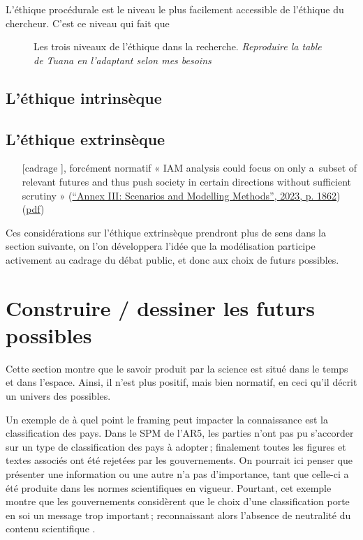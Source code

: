 L'éthique procédurale est le niveau le plus facilement accessible de l'éthique du chercheur. C'est ce niveau qui fait que 

\begin{figure}
    \centering
    \caption{Les trois niveaux de l'éthique dans la recherche. \textit{Reproduire la table de Tuana en l'adaptant selon mes besoins}}
    \label{fig:diag-venn}
\end{figure}

\subsection{L'éthique intrinsèque}

\subsection{L'éthique extrinsèque}


\begin{itemize}
    \item [[cadrage]], forcément normatif
« IAM analysis could focus on only a subset of relevant futures and thus push society in certain directions without sufficient scrutiny » (\href{zotero://select/library/items/2SDDNUUF}{“Annex III: Scenarios and Modelling Methods”, 2023, p. 1862}) (\href{zotero://open-pdf/library/items/CHVFSLLH?page=22&annotation=4MBM5B9Q}{pdf})

\end{itemize}

 Ces considérations sur l'éthique extrinsèque prendront plus de sens dans la section suivante, on l'on développera l'idée que la modélisation participe activement au cadrage du débat public, et donc aux choix de futurs possibles. 

\section{Construire / dessiner les futurs possibles}

Cette section montre que le savoir produit par la science est situé dans le temps et dans l'espace. Ainsi, il n'est plus positif, mais bien normatif, en ceci qu'il décrit un univers des possibles. 

Un exemple de à quel point le framing peut impacter la connaissance est la classification des pays. Dans le SPM de l'AR5, les parties n'ont pas pu s'accorder sur un type de classification des pays à adopter ; finalement toutes les figures et textes associés ont été rejetées par les gouvernements. On pourrait ici penser que présenter une information ou une autre n'a pas d'importance, tant que celle-ci a été produite dans les normes scientifiques en vigueur. Pourtant, cet exemple montre que les gouvernements considèrent que le choix d'une classification porte en soi un message trop important ; reconnaissant alors l'absence de neutralité du contenu scientifique \cite{edenhofer_mapmakers_2014}. 


